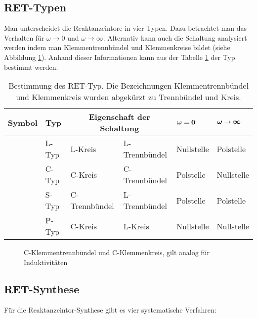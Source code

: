 \subsection{RET-Typen}
Man unterscheidet die Reaktanzeintore in vier Typen. Dazu betrachtet man das
Verhalten für $\omega \rightarrow 0$ und $\omega \rightarrow \infty$. Alternativ
kann auch die Schaltung analysiert werden indem man Klemmentrennbündel und
Klemmenkreise bildet (siehe Abbildung \ref{fig:ret}). Anhand dieser
Informationen kann aus der Tabelle \ref{tab:RETTyp} der Typ bestimmt werden.

\begin{table}[!ht]
\begin{tabular}{|l|l|l|l|l|l|}
\hline
\textbf{Symbol} & \textbf{Typ} &
\multicolumn{2}{|c|}{\textbf{Eigenschaft der Schaltung}} & $\bf
\boldsymbol\omega = 0$ & $\bf \boldsymbol\omega \rightarrow \boldsymbol\infty$\\
\hline
\parbox[c][1.5cm]{4.2cm}{} & L-Typ &
L-Kreis & L-Trennbündel & Nullstelle & Polstelle\\
\hline
\parbox[c][1.5cm]{4.2cm}{} & C-Typ &
C-Kreis & C-Trennbündel & Polstelle & Nullstelle\\
\hline
\parbox[c][1.5cm]{4.2cm}{} & S-Typ &
C-Trennbündel & L-Trennbündel & Polstelle & Polstelle\\
\hline
\parbox[c][1.5cm]{4.2cm}{} & P-Typ &
C-Kreis & L-Kreis & Nullstelle & Nullstelle\\
\hline
\end{tabular}
\caption[Bestimmung des RET-Typ]{Bestimmung des RET-Typ. Die Bezeichnungen
Klemmentrennbündel und Klemmenkreis wurden abgekürzt zu Trennbündel und Kreis.}
\label{tab:RETTyp}
\end{table}

\begin{figure}[!ht]
\centering
\subfloat[C-Klemmentrennbündel]{
	
	\label{fig:ret:klemmenbuendel}
}
\qquad
\subfloat[C-Klemmenkreis]{
	
	\label{fig:ret:klemmenkreis} 
}
\caption[Klemmentrennbündel und Klemmenkreis]{C-Klemmentrennbündel und
C-Klemmenkreis, gilt analog für Induktivitäten}
\label{fig:ret}
\end{figure}




\subsection{RET-Synthese}
Für die Reaktanzeintor-Synthese gibt es vier systematische Verfahren:

